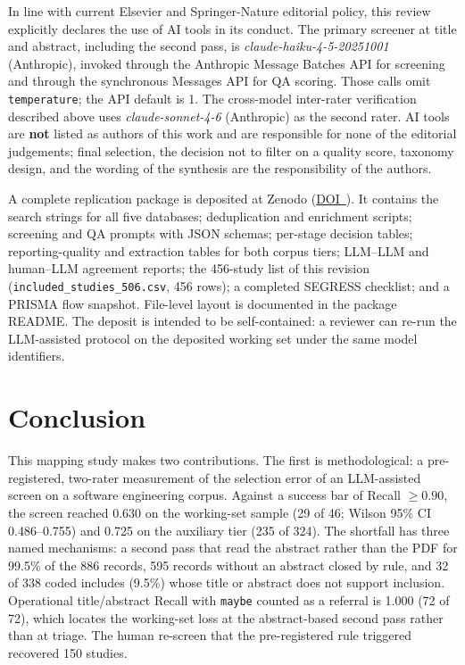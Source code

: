 In line with current Elsevier and Springer-Nature editorial policy, this
review explicitly declares the use of AI tools in its conduct. The primary
screener at title and abstract, including the second pass, is
\textit{claude-haiku-4-5-20251001} (Anthropic), invoked through the
Anthropic Message Batches API for screening and through the
synchronous Messages API for QA scoring. Those calls omit
\texttt{temperature}; the API default is 1. The cross-model
inter-rater verification described above uses
\textit{claude-sonnet-4-6} (Anthropic) as the second rater. AI tools are
\textbf{not} listed as authors of this work and are responsible for none of
the editorial judgements; final selection, the decision not to filter on a
quality score, taxonomy design, and the wording of the synthesis are the
responsibility of the authors.

A complete replication package is deposited at Zenodo
(\href{\zenododoiurl}{DOI~\zenododoi}).
It contains the search strings for all five databases; deduplication and
enrichment scripts; screening and QA prompts with JSON schemas; per-stage
decision tables; reporting-quality and extraction tables for both corpus
tiers; LLM--LLM and human--LLM agreement reports; the 456-study list of
this revision (\texttt{included\_studies\_506.csv}, 456 rows); a completed SEGRESS checklist; and a PRISMA flow snapshot.
File-level layout is documented in the package README. The deposit is
intended to be self-contained: a reviewer can re-run the LLM-assisted
protocol on the deposited working set under the same model identifiers.


\section{Conclusion}
\label{sec:slr-summary}

This mapping study makes two contributions. The first is methodological:
a pre-registered, two-rater measurement of the selection error of an
LLM-assisted screen on a software engineering corpus. Against a success
bar of Recall $\geq 0.90$, the screen reached 0.630 on the working-set
sample (29 of 46; Wilson 95\% CI 0.486--0.755) and 0.725 on the auxiliary
tier (235 of 324). The shortfall has three named mechanisms: a second
pass that read the abstract rather than the PDF for 99.5\% of the 886
records, 595 records without an abstract closed by rule, and 32 of 338
coded includes (9.5\%) whose title or abstract does not support
inclusion. Operational title/abstract Recall with \texttt{maybe} counted
as a referral is 1.000 (72 of 72), which locates the working-set loss at
the abstract-based second pass rather than at triage. The human re-screen
that the pre-registered rule triggered recovered 150 studies.

